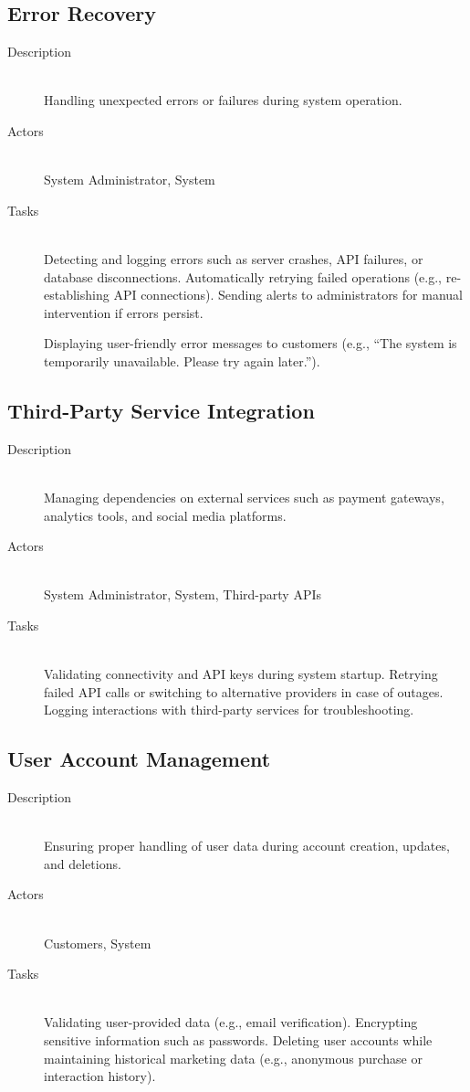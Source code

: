 \documentclass[twoside,a4paper,journal]{IEEEtran}
\begin{document}
\subsection{Error Recovery}
\begin{description}
  \item[Description] \hfill \\
    Handling unexpected errors or failures during system operation.
  \item[Actors] \hfill \\
    System Administrator, System
  \item[Tasks] \hfill \\
    Detecting and logging errors such as server crashes, API failures, or
    database disconnections.
    Automatically retrying failed operations (e.g., re-establishing API
    connections).
    Sending alerts to administrators for manual intervention if errors persist.

    Displaying user-friendly error messages to customers (e.g., ``The system is
    temporarily unavailable. Please try again later.'').
\end{description}

\subsection{Third-Party Service Integration}
\begin{description}
  \item[Description] \hfill \\
    Managing dependencies on external services such as payment gateways,
    analytics tools, and social media platforms.
  \item[Actors] \hfill \\
    System Administrator, System, Third-party APIs
  \item[Tasks] \hfill \\
    Validating connectivity and API keys during system startup.
    Retrying failed API calls or switching to alternative providers in case of
    outages.
    Logging interactions with third-party services for troubleshooting.
\end{description}

\subsection{User Account Management}
\begin{description}
  \item[Description] \hfill \\
    Ensuring proper handling of user data during account creation, updates, and
    deletions.
  \item[Actors] \hfill \\
    Customers, System
  \item[Tasks] \hfill \\
    Validating user-provided data (e.g., email verification).
    Encrypting sensitive information such as passwords.
    Deleting user accounts while maintaining historical marketing data
    (e.g., anonymous purchase or interaction history).
\end{description}
\end{document}
